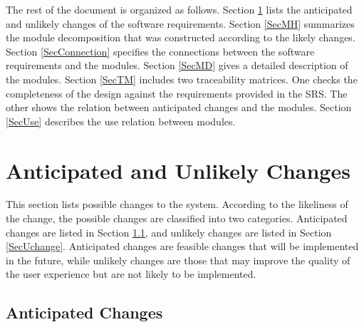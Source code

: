 \documentclass[12pt, titlepage]{article}
\begin{document}

The rest of the document is organized as follows. Section
\ref{SecChange} lists the anticipated and unlikely changes of the software
requirements. Section \ref{SecMH} summarizes the module decomposition that
was constructed according to the likely changes. Section \ref{SecConnection}
specifies the connections between the software requirements and the
modules. Section \ref{SecMD} gives a detailed description of the
modules. Section \ref{SecTM} includes two traceability matrices. One checks
the completeness of the design against the requirements provided in the SRS. The
other shows the relation between anticipated changes and the modules. Section
\ref{SecUse} describes the use relation between modules.

\section{Anticipated and Unlikely Changes} \label{SecChange} %

This section lists possible changes to the system. According to the likeliness
of the change, the possible changes are classified into two
categories. Anticipated changes are listed in Section \ref{SecAchange}, and
unlikely changes are listed in Section \ref{SecUchange}. Anticipated changes are feasible changes that will be implemented in the future, while unlikely changes are those that may improve the quality of the user experience but are not likely to be implemented.

\subsection{Anticipated Changes} \label{SecAchange}
\end{document}
